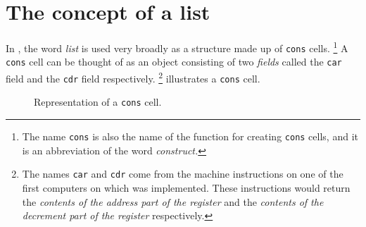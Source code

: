 \chapter{The concept of a list}
\label{chap-list-concept}

In \cl{}, the word \emph{list} is used very broadly as a structure
made up of \texttt{cons} cells.%
\footnote{The name \texttt{cons} is also the name of the function for
  creating \texttt{cons} cells, and it is an abbreviation of the word
  \emph{construct.}}  A \texttt{cons} cell can be thought of as an
object consisting of two \emph{fields} called the \texttt{car} field
and the \texttt{cdr} field respectively.%
\footnote{The names \texttt{car} and \texttt{cdr} come from the
  machine instructions on one of the first computers on which \lisp{}
  was implemented.  These instructions would return the \emph{contents
    of the address part of the register} and the \emph{contents of the
    decrement part of the register} respectively.}
 illustrates a \texttt{cons} cell.

\begin{figure}
\begin{center}
\end{center}
\caption{\label{fig-cons-cell}
Representation of a \texttt{cons} cell.}
\end{figure}

